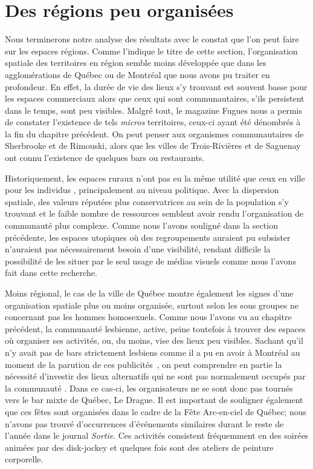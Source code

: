 \section{Des régions peu organisées}
\label{sec:des_regions_peu_organisees}
Nous terminerons notre analyse des résultats avec le constat que l'on peut faire sur les espaces régions.
Comme l'indique le titre de cette section, l'organisation spatiale des territoires en région semble moins développée que dans les agglomérations de Québec ou de Montréal que nous avons pu traiter en profondeur.
En effet, la durée de vie des lieux \lgbt{} s'y trouvant est souvent basse pour les espaces commerciaux alors que ceux qui sont communautaires, s'ils persistent dans le temps, sont peu visibles.
Malgré tout, le magazine Fugues nous a permis de constater l'existence de tels \emph{micros} territoires, ceux-ci ayant été dénombrés à la fin du chapitre précédent.
On peut penser aux organismes communautaires de Sherbrooke et de Rimouski, alors que les villes de Trois-Rivières et de Saguenay ont connu l'existence de quelques bars ou restaurants.

Historiquement, les espaces ruraux n'ont pas eu la même utilité que ceux en ville pour les individus \lgbt{}, principalement au niveau politique.
Avec la dispersion spatiale, des valeurs réputées plus conservatrices au sein de la population s'y trouvant et le faible nombre de ressources semblent avoir rendu l'organisation de communauté \lgbt{} plus complexe.
Comme nous l'avons souligné dans la section précédente, les espaces utopiques où des regroupements \lgbt{} auraient pu subsister n'auraient pas nécessairement besoin d'une visibilité, rendant difficile la possibilité de les situer par le seul usage de médias visuels comme nous l'avons fait dans cette recherche.

Moins régional, le cas de la ville de Québec montre également les signes d'une organisation spatiale plus ou moins organisée, surtout selon les sous groupes ne concernant pas les hommes homosexuels.
Comme nous l'avons vu au chapitre précédent, la communauté lesbienne, active, peine toutefois à trouver des espaces où organiser ses activités, ou, du moins, vise des lieux peu visibles.
Sachant qu'il n'y avait pas de bars strictement lesbiens comme il a pu en avoir à Montréal au moment de la parution de ces publicités~\citep{Podmore2006}, on peut comprendre en partie la nécessité d'investir des lieux alternatifs qui ne sont pas normalement occupés par la communauté \lgbt{}.
Dans ce cas-ci, les organisateurs ne se sont donc pas tournés vers le bar mixte de Québec, Le Drague.
Il est important de souligner également que ces fêtes sont organisées dans le cadre de la Fête Arc-en-ciel de Québec; nous n'avons pas trouvé d'occurrences d'événements similaires durant le reste de l'année dans le journal \emph{Sortie}.
Ces activités consistent fréquemment en des soirées animées par des disk-jockey et quelques fois sont des ateliers de peinture corporelle.

